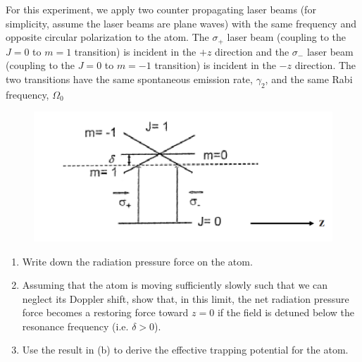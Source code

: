 \documentclass[12pt]{article}
\begin{document}
For this experiment, we apply two counter propagating laser beams (for simplicity, assume the laser beams are plane waves) with the same frequency and opposite circular polarization to the atom.
The $\sigma_+$ laser beam (coupling to the $J=0$ to $m=1$ transition) is incident in the $+z$ direction and the $\sigma_-$ laser beam (coupling to the $J=0$ to $m=-1$ transition) is incident in the $-z$ direction.
The two transitions have the same spontaneous emission rate, $\gamma_2$, and the same Rabi frequency, $\Omega_0$
\begin{figure}[h]
    \centering
    \includegraphics[scale=.75]{polarized_beams.png}
\end{figure}
\begin{enumerate}[label=(\alph*)]
    \item Write down the radiation pressure force on the atom.
    \item Assuming that the atom is moving sufficiently slowly such that we can neglect its Doppler shift, show that, in this limit, the net radiation pressure force becomes a restoring force toward $z=0$ if the field is detuned below the resonance frequency (i.e. $\delta>0$).
    \item Use the result in (b) to derive the effective trapping potential for the atom.
\end{enumerate}

%
\end{document}
